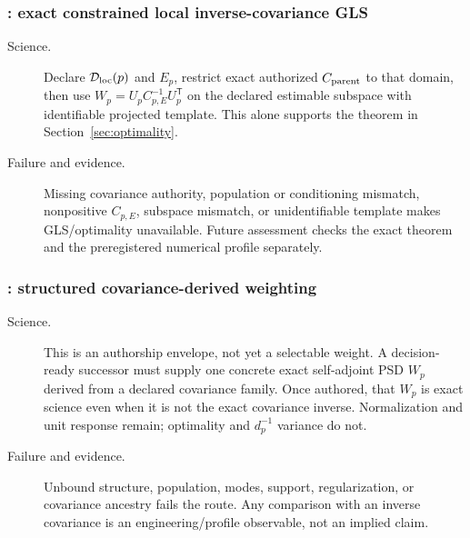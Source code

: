 \subsubsection{: exact constrained local inverse-covariance GLS}
\begin{description}
\item[Science.] Declare $\mathcal{D}_{\rm loc}(p)$ and $E_p$, restrict exact authorized
$C_{\rm parent}$ to that domain, then use
$W_p=U_pC_{p,E}^{-1}U_p^{\mathsf T}$ on the declared estimable subspace with
identifiable projected template. This alone supports the theorem in
Section~\ref{sec:optimality}.
\item[Failure and evidence.] Missing covariance authority, population or
conditioning mismatch, nonpositive $C_{p,E}$, subspace mismatch, or
unidentifiable template makes GLS/optimality unavailable. Future assessment
checks the exact theorem and the preregistered numerical profile separately.
\end{description}

\subsubsection{: structured covariance-derived weighting}
\begin{description}
\item[Science.] This is an authorship envelope, not yet a selectable weight.
A decision-ready successor must supply one concrete exact self-adjoint PSD
$W_p$ derived from a declared covariance family. Once authored, that $W_p$ is
exact science even when it is not the exact covariance inverse. Normalization
and unit response remain; optimality and $d_p^{-1}$ variance do not.
\item[Failure and evidence.] Unbound structure, population, modes, support,
regularization, or covariance ancestry fails the route. Any comparison with an
inverse covariance is an engineering/profile observable, not an implied claim.
\end{description}

